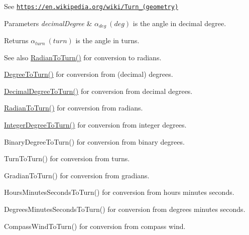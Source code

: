 See \href{https://en.wikipedia.org/wiki/Turn_(geometry)}{\tt https\+://en.\+wikipedia.\+org/wiki/\+Turn\+\_\+(geometry)} 
\begin{DoxyParams}{Parameters}
{\em decimal\+Degree} & $\alpha_{deg}\ (deg)$ is the angle in decimal degree. \\
\hline
\end{DoxyParams}
\begin{DoxyReturn}{Returns}
$\alpha_{turn}\ (turn)$ is the angle in turns. 
\end{DoxyReturn}
\begin{DoxySeeAlso}{See also}
\mbox{\hyperlink{group___e_g_x_math-_angle_conversions-_radian_ga8492d6d2f6467c619b65e5fb75a9ae04}{Radian\+To\+Turn()}} for conversion to radians. 

\mbox{\hyperlink{group___e_g_x_math-_angle_conversions-_degree_gafb4ce930493a7d6202ede3ee1630ef5d}{Degree\+To\+Turn()}} for conversion from (decimal) degrees. 

\mbox{\hyperlink{group___e_g_x_math-_angle_conversions-_decimal_degree_ga396a13c10acdef5026c12f3217b142c1}{Decimal\+Degree\+To\+Turn()}} for conversion from decimal degrees. 

\mbox{\hyperlink{group___e_g_x_math-_angle_conversions-_radian_ga8492d6d2f6467c619b65e5fb75a9ae04}{Radian\+To\+Turn()}} for conversion from radians. 

\mbox{\hyperlink{group___e_g_x_math-_angle_conversions-_integer_degree_ga06ddbdada5a3978105c855d4aae735ae}{Integer\+Degree\+To\+Turn()}} for conversion from integer degrees. 

Binary\+Degree\+To\+Turn() for conversion from binary degrees. 

Turn\+To\+Turn() for conversion from turns. 

Gradian\+To\+Turn() for conversion from gradians. 

Hours\+Minutes\+Seconds\+To\+Turn() for conversion from hours minutes seconds. 

Degrees\+Minutes\+Seconds\+To\+Turn() for conversion from degrees minutes seconds. 

Compass\+Wind\+To\+Turn() for conversion from compass wind. 
\end{DoxySeeAlso}
